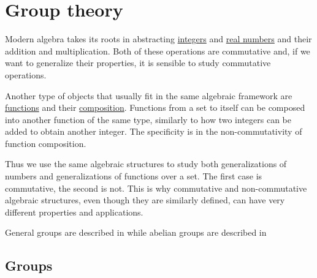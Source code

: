 \section{Group theory}\label{sec:group_theory}

\begin{remark}\label{remark:numbers_vs_endomorphisms_generalizations}
  Modern algebra takes its roots in abstracting \hyperref[def:integers]{integers} and \hyperref[def:real_numbers]{real numbers} and their addition and multiplication. Both of these operations are commutative and, if we want to generalize their properties, it is sensible to study commutative operations.

  Another type of objects that usually fit in the same algebraic framework are \hyperref[def:function]{functions} and their \hyperref[def:function/composition]{composition}. Functions from a set to itself can be composed into another function of the same type, similarly to how two integers can be added to obtain another integer. The specificity is in the non-commutativity of function composition.

  Thus we use the same algebraic structures to study both generalizations of numbers and generalizations of functions over a set. The first case is commutative, the second is not. This is why commutative and non-commutative algebraic structures, even though they are similarly defined, can have very different properties and applications.

  General groups are described in  while abelian groups are described in 
\end{remark}

\subsection{Groups}\label{subsec:groups}

